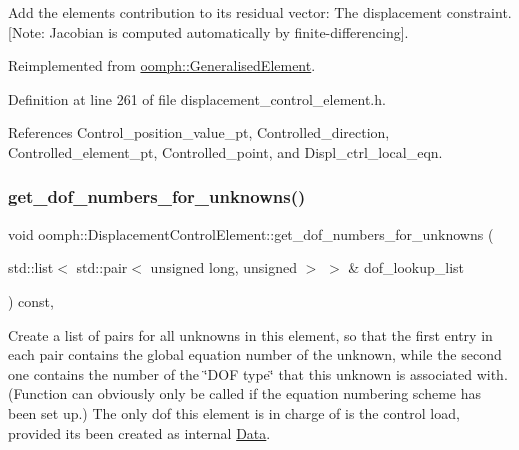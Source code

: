 Add the element\textquotesingle{}s contribution to its residual vector\+: The displacement constraint. \mbox{[}Note\+: Jacobian is computed automatically by finite-\/differencing\mbox{]}. 



Reimplemented from \hyperlink{classoomph_1_1GeneralisedElement_a310c97f515e8504a48179c0e72c550d7}{oomph\+::\+Generalised\+Element}.



Definition at line 261 of file displacement\+\_\+control\+\_\+element.\+h.



References Control\+\_\+position\+\_\+value\+\_\+pt, Controlled\+\_\+direction, Controlled\+\_\+element\+\_\+pt, Controlled\+\_\+point, and Displ\+\_\+ctrl\+\_\+local\+\_\+eqn.

\mbox{\label{classoomph_1_1DisplacementControlElement_a4b076c21ac84aefbb52f4bf0c7a40cc8}} 
\subsubsection{\texorpdfstring{get\+\_\+dof\+\_\+numbers\+\_\+for\+\_\+unknowns()}{get\_dof\_numbers\_for\_unknowns()}}
{\footnotesize\ttfamily void oomph\+::\+Displacement\+Control\+Element\+::get\+\_\+dof\+\_\+numbers\+\_\+for\+\_\+unknowns (\begin{DoxyParamCaption}\item[{std\+::list$<$ std\+::pair$<$ unsigned long, unsigned $>$ $>$ \&}]{dof\+\_\+lookup\+\_\+list }\end{DoxyParamCaption}) const\hspace{0.3cm}{\ttfamily [inline]}, {\ttfamily [virtual]}}



Create a list of pairs for all unknowns in this element, so that the first entry in each pair contains the global equation number of the unknown, while the second one contains the number of the \char`\"{}\+D\+O\+F type\char`\"{} that this unknown is associated with. (Function can obviously only be called if the equation numbering scheme has been set up.) The only dof this element is in charge of is the control load, provided it\textquotesingle{}s been created as internal \hyperlink{classoomph_1_1Data}{Data}. 



